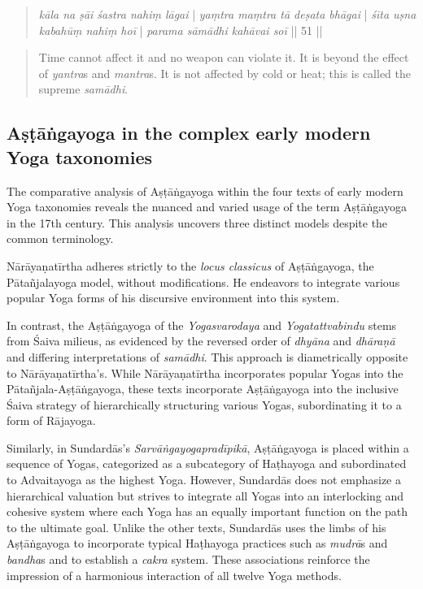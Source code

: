 \begin{quote}
\textit{kāla na ṣāi śastra nahiṃ lāgai} | \textit{yaṃtra maṃtra tā deṣata bhāgai} | 
\textit{śīta uṣna kabahūṃ nahiṃ hoī} | \textit{parama sāmādhi kahāvai soī }|| 51 || 
\end{quote}
\begin{quote}
Time cannot affect it and no weapon can violate it. It is beyond the effect of \textit{yantra}s and \textit{mantra}s. It is not affected by cold or heat; this is called the supreme \textit{samādhi}.
\end{quote}

\subsection{Aṣṭāṅgayoga in the complex early modern Yoga taxonomies}

The comparative analysis of Aṣṭāṅgayoga within the four texts of early modern Yoga taxonomies reveals the nuanced and varied usage of the term Aṣṭāṅgayoga in the 17th century. This analysis uncovers three distinct models despite the common terminology.

Nārāyaṇatīrtha adheres strictly to the \textit{locus classicus} of Aṣṭāṅgayoga, the Pātañjalayoga model, without modifications. He endeavors to integrate various popular Yoga forms of his discursive environment into this system.

In contrast, the Aṣṭāṅgayoga of the \textit{Yogasvarodaya} and \textit{Yogatattvabindu} stems from Śaiva milieus, as evidenced by the reversed order of \textit{dhyāna} and \textit{dhāraṇā} and differing interpretations of \textit{samādhi}. This approach is diametrically opposite to Nārāyaṇatīrtha's. While Nārāyaṇatīrtha incorporates popular Yogas into the Pātañjala-Aṣṭāṅgayoga, these texts incorporate Aṣṭāṅgayoga into the inclusive Śaiva strategy of hierarchically structuring various Yogas, subordinating it to a form of Rājayoga.

Similarly, in Sundardās's \emph{Sarvāṅgayogapradīpikā}, Aṣṭāṅgayoga is placed within a sequence of Yogas, categorized as a subcategory of Haṭhayoga and subordinated to Advaitayoga as the highest Yoga. However, Sundardās does not emphasize a hierarchical valuation but strives to integrate all Yogas into an interlocking and cohesive system where each Yoga has an equally important function on the path to the ultimate goal. Unlike the other texts, Sundardās uses the limbs of his Aṣṭāṅgayoga to incorporate typical Haṭhayoga practices such as \textit{mudrā}s and \textit{bandha}s and to establish a \textit{cakra} system. These associations reinforce the impression of a harmonious interaction of all twelve Yoga methods.

